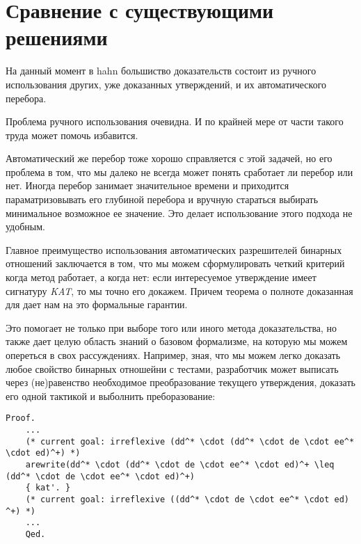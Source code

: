 \documentclass[times
              ]{itmo-student-thesis}
\begin{document}
  \newpage %
  \section{Сравнение с существующими решениями}

    На данный момент в hahn большиство доказательств состоит из ручного использования других, уже
    доказанных утверждений, и их автоматического перебора.

    Проблема ручного использования очевидна. И по крайней мере от части такого труда 
    может помочь избавится.

    Автоматический же перебор тоже хорошо справляется с этой задачей, но его проблема в том, что мы
    далеко не всегда может понять сработает ли перебор или нет. Иногда перебор занимает значительное
    времени и приходится параматризовывать его глубиной перебора и вручную стараться выбирать
    минимальное возможное ее значение. Это делает использование этого подхода не удобным.

    Главное преимущество использования автоматических разрешителей бинарных отношений заключается в
    том, что мы можем сформулировать четкий критерий когда метод работает, а когда нет: если
    интересуемое утверждение имеет сигнатуру \textit{KAT}, то мы точно его докажем. Причем теорема о
    полноте доказанная для  дает нам на это формальные гарантии.

    Это помогает не только при выборе того или иного метода доказательства, но также дает целую область
    знаний о базовом формализме, на которую мы можем опереться в свох рассуждениях. Например, зная, что
    мы можем легко доказать любое свойство бинарных отношейни с тестами, разработчик может выписать через
    (не)равенство необходимое преобразование текущего утверждения, доказать его одной тактикой
     и выболнить преборазование:

    \begin{lstlisting}[float=false, gobble=4,
      caption={Пример доказательства вспомогательного утверждения, необходимого для преобразования, с
        помощью \textit{KAT}}, label={lst:arewrite}]
    Proof.
    ...
    (* current goal: irreflexive (dd^* \cdot (dd^* \cdot de \cdot ee^* \cdot ed)^+) *)
    arewrite(dd^* \cdot (dd^* \cdot de \cdot ee^* \cdot ed)^+ \leq (dd^* \cdot de \cdot ee^* \cdot ed)^+)
    { kat'. }
    (* current goal: irreflexive ((dd^* \cdot de \cdot ee^* \cdot ed) ^+) *)
    ...
    Qed.
    \end{lstlisting}
\end{document}
